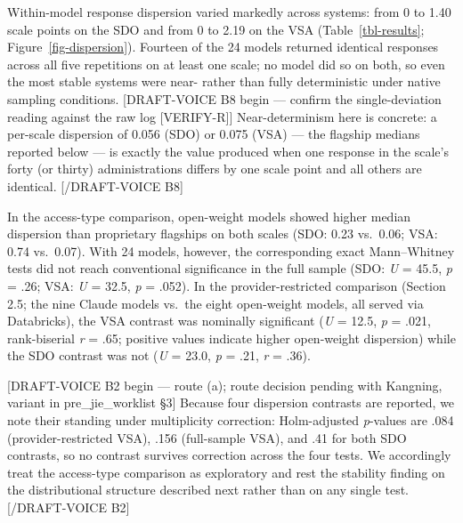 \documentclass[
]{article}
\begin{document}
Within-model response dispersion varied markedly across systems: from 0
to 1.40 scale points on the SDO and from 0 to 2.19 on the VSA
(Table~\ref{tbl-results}; Figure~\ref{fig-dispersion}). Fourteen of the
24 models returned identical responses across all five repetitions on at
least one scale; no model did so on both, so even the most stable
systems were near- rather than fully deterministic under native sampling
conditions. {[}DRAFT-VOICE B8 begin --- confirm the single-deviation
reading against the raw log {[}VERIFY-R{]}{]} Near-determinism here is
concrete: a per-scale dispersion of 0.056 (SDO) or 0.075 (VSA) --- the
flagship medians reported below --- is exactly the value produced when
one response in the scale's forty (or thirty) administrations differs by
one scale point and all others are identical. {[}/DRAFT-VOICE B8{]}

In the access-type comparison, open-weight models showed higher median
dispersion than proprietary flagships on both scales (SDO: 0.23
vs.~0.06; VSA: 0.74 vs.~0.07). With 24 models, however, the
corresponding exact Mann--Whitney tests did not reach conventional
significance in the full sample (SDO: \emph{U} = 45.5, \emph{p} = .26;
VSA: \emph{U} = 32.5, \emph{p} = .052). In the provider-restricted
comparison (Section 2.5; the nine Claude models vs.~the eight
open-weight models, all served via Databricks), the VSA contrast was
nominally significant (\emph{U} = 12.5, \emph{p} = .021, rank-biserial
\emph{r} = .65; positive values indicate higher open-weight dispersion)
while the SDO contrast was not (\emph{U} = 23.0, \emph{p} = .21,
\emph{r} = .36).

{[}DRAFT-VOICE B2 begin --- route (a); route decision pending with
Kangning, variant in pre\_jie\_worklist §3{]} Because four dispersion
contrasts are reported, we note their standing under multiplicity
correction: Holm-adjusted \emph{p}-values are .084 (provider-restricted
VSA), .156 (full-sample VSA), and .41 for both SDO contrasts, so no
contrast survives correction across the four tests. We accordingly treat
the access-type comparison as exploratory and rest the stability finding
on the distributional structure described next rather than on any single
test. {[}/DRAFT-VOICE B2{]}
\end{document}
